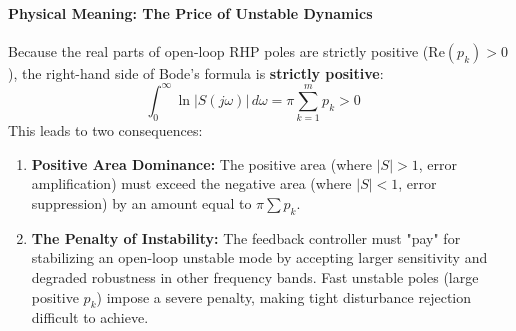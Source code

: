 \documentclass[12pt,onecolumn,twoside ]{article}
\begin{document}
	\paragraph{Physical Meaning: The Price of Unstable Dynamics}
	Because the real parts of open-loop RHP poles are strictly positive ($\text{Re}(p_k) > 0$), the right-hand side of Bode's formula is \textbf{strictly positive}: \[
	\int_{0}^{\infty} \ln |S(j\omega)|\, d\omega = \pi \sum_{k=1}^m p_k > 0 \quad
	\]
	This leads to two consequences:
	\begin{enumerate}
		\item
		\textbf{Positive Area Dominance:} The positive area (where $|S| > 1$, error amplification) must exceed the negative area (where $|S| < 1$, error suppression) by an amount equal to $\pi \sum p_k$.
		\item
		\textbf{The Penalty of Instability:} The feedback controller must "pay" for stabilizing an open-loop unstable mode by accepting larger sensitivity and degraded robustness in other frequency bands. Fast unstable poles (large positive $p_k$) impose a severe penalty, making tight disturbance rejection difficult to achieve.
	\end{enumerate}
\end{document}
